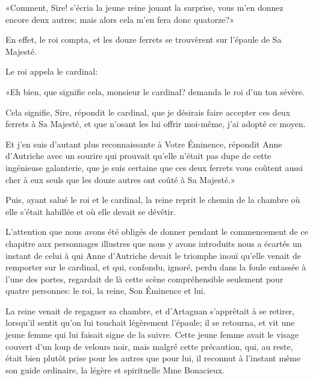 «Comment, Sire! s'écria la jeune reine jouant la surprise, vous m'en donnez encore deux autres; mais alors cela m'en fera donc quatorze?» 

En effet, le roi compta, et les douze ferrets se trouvèrent sur l'épaule de Sa Majesté. 

Le roi appela le cardinal: 

«Eh bien, que signifie cela, monsieur le cardinal? demanda le roi d'un ton sévère. 

\speak  Cela signifie, Sire, répondit le cardinal, que je désirais faire accepter ces deux ferrets à Sa Majesté, et que n'osant les lui offrir moi-même, j'ai adopté ce moyen. 

\speak  Et j'en suis d'autant plus reconnaissante à Votre Éminence, répondit Anne d'Autriche avec un sourire qui prouvait qu'elle n'était pas dupe de cette ingénieuse galanterie, que je suis certaine que ces deux ferrets vous coûtent aussi cher à eux seuls que les douze autres ont coûté à Sa Majesté.» 

Puis, ayant salué le roi et le cardinal, la reine reprit le chemin de la chambre où elle s'était habillée et où elle devait se dévêtir. 

L'attention que nous avons été obligés de donner pendant le commencement de ce chapitre aux personnages illustres que nous y avons introduits nous a écartés un instant de celui à qui Anne d'Autriche devait le triomphe inouï qu'elle venait de remporter sur le cardinal, et qui, confondu, ignoré, perdu dans la foule entassée à l'une des portes, regardait de là cette scène compréhensible seulement pour quatre personnes: le roi, la reine, Son Éminence et lui. 

La reine venait de regagner sa chambre, et d'Artagnan s'apprêtait à se retirer, lorsqu'il sentit qu'on lui touchait légèrement l'épaule; il se retourna, et vit une jeune femme qui lui faisait signe de la suivre. Cette jeune femme avait le visage couvert d'un loup de velours noir, mais malgré cette précaution, qui, au reste, était bien plutôt prise pour les autres que pour lui, il reconnut à l'instant même son guide ordinaire, la légère et spirituelle Mme Bonacieux. 

